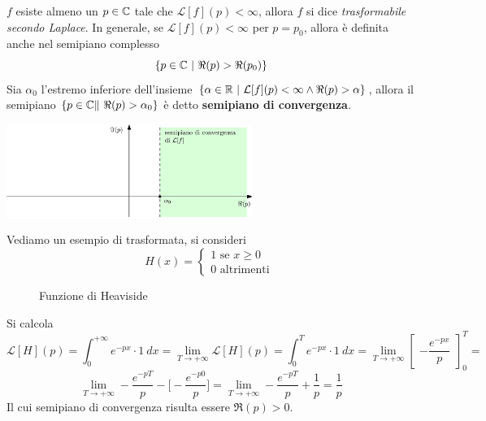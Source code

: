 \documentclass[10pt, letterpaper]{report}
\begin{document}
 $f$ esiste almeno un $p\in{\mathbb C}$ tale che $\mathcal{L}[f](p)<\infty$, allora $f$ si dice 
 \textit{trasformabile secondo Laplace}.\acc
 In generale, se $\mathcal{L}[f](p)<\infty$ per $p=p_0$, allora è definita anche nel semipiano 
 complesso $$\{p\in {\mathbb C} \ |\ \Re(p)>\Re(p_0)\}$$
 Sia $\alpha_0$ l'estremo inferiore dell'insieme $\{\alpha \in {\mathbb R} \ |\ \mathcal{L}[f](p)<\infty\land \Re(p)>\alpha\}$, allora 
 il semipiano $\{p\in \C \|\ \Re(p)>\alpha_0\}$ è detto \textbf{semipiano di convergenza}.
 \begin{center}
    \includegraphics[width=0.6\textwidth ]{images/semiPianoConv.eps}
 \end{center}
 Vediamo un esempio di trasformata, si consideri $$ 
 H(x)=\begin{cases}
    1 \text{ se }x\ge 0\\ 0 \text{ altrimenti }
 \end{cases}
 $$
 \begin{center}
 \begin{figure}[h!]
    \centering
        \caption{Funzione di Heaviside}
\end{figure}
\end{center}
Si calcola 
$$ \mathcal{L}[H](p)=\int_0^{+\infty}e^{-px}\cdot 1 \ dx = 
\lim_{T\rightarrow+\infty}\mathcal{L}[H](p)=\int_0^{T}e^{-px}\cdot 1 \ dx = 
\lim_{T\rightarrow+\infty}\begin{bmatrix}
    -\dfrac{e^{-px}}{p}
\end{bmatrix}_0^T=$$
$$\lim_{T\rightarrow+\infty} -\dfrac{e^{-pT}}{p} - \Big[-\dfrac{e^{-p0}}{p}\Big] =  
\lim_{T\rightarrow+\infty} -\dfrac{e^{-pT}}{p} +\dfrac{1}{p}=\frac{1}{p}$$
Il cui semipiano di convergenza risulta essere $\Re(p)>0$.
\end{document}
